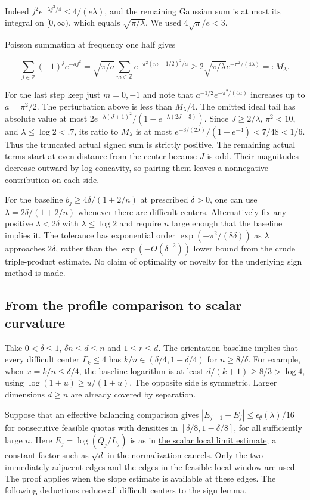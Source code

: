\documentclass[11pt]{article}
\begin{document}
Indeed $j^2e^{-\lambda j^2/4}\le4/(e\lambda)$, and the remaining
Gaussian sum is at most its integral on $[0,\infty)$, which equals
$\sqrt{\pi/\lambda}$. We used $4\sqrt\pi/e<3$.

Poisson summation at frequency one half gives

\[
\sum_{j\in\mathbb Z}(-1)^j e^{-a j^2}
=\sqrt{\pi/a}\sum_{m\in\mathbb Z}e^{-\pi^2(m+1/2)^2/a}
\ge 2\sqrt{\pi/\lambda}e^{-\pi^2/(4\lambda)}=:M_\lambda .
\]

For the last step keep just $m=0,-1$ and note that
$a^{-1/2}e^{-\pi^2/(4a)}$ increases up to $a=\pi^2/2$.
The perturbation above is less than $M_\lambda/4$.
The omitted ideal tail has absolute value at most
$2e^{-\lambda(J+1)^2}/(1-e^{-\lambda(2J+3)})$.
Since $J\ge2/\lambda$, $\pi^2<10$, and $\lambda\le\log2<.7$,
its ratio to $M_\lambda$ is at most
$e^{-3/(2\lambda)}/(1-e^{-4})<7/48<1/6$.
Thus the truncated actual signed sum is strictly positive. The
remaining actual terms start at even distance from the center because
$J$ is odd. Their magnitudes decrease outward by log-concavity, so
pairing them leaves a nonnegative contribution on each side.

For the baseline $b_j\ge4\delta/(1+2/n)$ at prescribed $\delta>0$,
one can use $\lambda=2\delta/(1+2/n)$ whenever there are difficult
centers. Alternatively fix any positive $\lambda<2\delta$ with
$\lambda\le\log2$ and require $n$ large enough that the baseline implies
it. The tolerance has exponential order $\exp(-\pi^2/(8\delta))$ as
$\lambda$ approaches $2\delta$, rather than the $\exp(-O(\delta^{-2}))$
lower bound from the crude triple-product estimate. No claim of
optimality or novelty for the underlying sign method is made.

\subsection{From the profile comparison to scalar curvature}

Take $0<\delta\le1$, $\delta n\le d\le n$ and $1\le r\le d$.
The orientation baseline implies that every difficult center
$\Gamma_k\le4$ has $k/n\in(\delta/4,1-\delta/4)$ for $n\ge8/\delta$.
For example, when $x=k/n\le\delta/4$, the baseline logarithm is at
least $d/(k+1)\ge8/3>\log4$, using $\log(1+u)\ge u/(1+u)$.
The opposite side is symmetric. Larger dimensions $d\ge n$ are
already covered by separation.

Suppose that an effective balancing comparison gives
$|E_{j+1}-E_j|\le\epsilon_\theta(\lambda)/16$ for consecutive feasible
quotas with densities in $[\delta/8,1-\delta/8]$, for all sufficiently
large $n$. Here $E_j=\log(Q_j/L_j)$ is as in \href{https://github.com/ProgramComputer/open-math-research/blob/main/topics/balanced-arrays/adjacent-quotas/scalar.md}{the scalar local limit estimate};
a constant factor such as $\sqrt d$ in the normalization cancels.
Only the two immediately adjacent edges and the edges in the feasible local window are used. The proof applies when the slope estimate is available at these edges. The following deductions reduce all difficult centers to the sign lemma.
\end{document}
